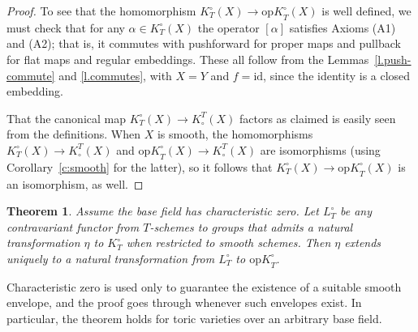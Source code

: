 \documentclass[11pt]{amsart}
\newtheorem{theorem}{Theorem}[section]
\theoremstyle{definition}
\begin{document}
\begin{proof}
To see that the homomorphism $K_T^\circ(X) \to {\mathrm{op}K}_T^\circ(X)$ is well defined, we must check that for any $\alpha\in K_T^\circ(X)$ the operator $[\alpha]$ satisfies Axioms (A1) and (A2); that is, it commutes with  pushforward for proper maps and pullback for flat maps and regular embeddings.  These all follow from the Lemmas~\ref{l.push-commute} and \ref{l.commutes}, with $X = Y$ and $f = {\mathrm{id}}$, since the identity is a closed embedding.

That the canonical map $K_T^\circ(X) \to K^T_\circ(X)$ factors as claimed is easily seen from the definitions.  When $X$ is smooth, the homomorphisms $K_T^\circ(X) \to K^T_\circ(X)$ and ${\mathrm{op}K}_T^\circ(X) \to K^T_\circ(X)$ are isomorphisms (using Corollary~\ref{c:smooth} for the latter), so it follows that $K_T^\circ(X) \to {\mathrm{op}K}_T^\circ(X)$ is an isomorphism, as well.
\end{proof}

\begin{theorem}\label{t.kh}
Assume the base field has characteristic zero.  Let $L_T^\circ$ be any contravariant functor from $T$-schemes to groups that admits a natural transformation $\eta$ to $K_T^\circ$ when restricted to smooth schemes.  Then $\eta$ extends uniquely to a natural transformation from $L_T^\circ$ to ${\mathrm{op}K}_T^\circ$.
\end{theorem}

Characteristic zero is used only to guarantee the existence of a suitable smooth envelope, and the proof goes through whenever such envelopes exist.  In particular, the theorem holds for toric varieties over an arbitrary base field.
\end{document}
